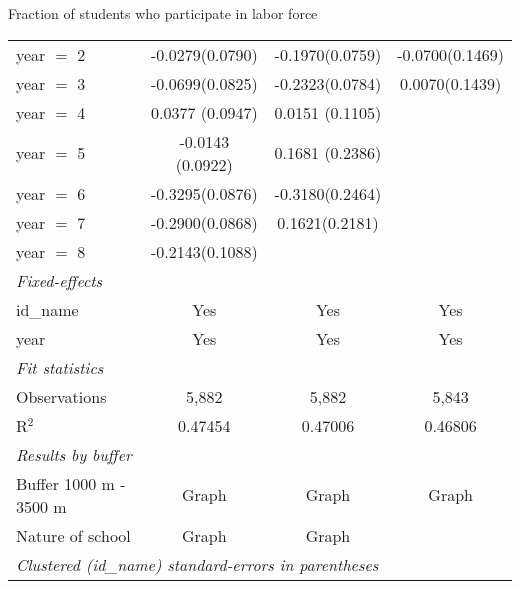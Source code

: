 \documentclass[9pt]{beamer}
\begin{document}
\begin{frame}{Fraction of students who participate in labor force}
\begin{center}
\begin{tabular}{lccc}
   year $=$ 2   & -0.0279(0.0790)           & -0.1970(0.0759) & -0.0700(0.1469)\\   
   year $=$ 3   & -0.0699(0.0825)           & -0.2323(0.0784) & 0.0070(0.1439)\\   
   year $=$ 4   & 0.0377 (0.0947)           & 0.0151 (0.1105)          &   \\   
   year $=$ 5   & -0.0143 (0.0922)        & 0.1681 (0.2386)           &   \\   
   year $=$ 6   & -0.3295(0.0876)   & -0.3180(0.2464)         &   \\   
   year $=$ 7   & -0.2900(0.0868) & 0.1621(0.2181)           &   \\   
   year $=$ 8   & -0.2143(0.1088)   &                 &   \\   
 
   \midrule
   \emph{Fixed-effects}\\
   id\_name     & Yes             & Yes             & Yes\\  
   year         & Yes             & Yes             & Yes\\  
   \midrule
   \emph{Fit statistics}\\
   Observations & 5,882           & 5,882           & 5,843\\  
   R$^2$        & 0.47454         & 0.47006         & 0.46806\\  
   \midrule
   \emph{Results by buffer}\\
   Buffer 1000 m - 3500 m  &  Graph\hyperlink{10p_labor_buf}{\beamerbutton{ !}}            &  Graph\hyperlink{50p_labor_buf}{\beamerbutton{ !}}             &  Graph\hyperlink{100p_labor_buf}{\beamerbutton{ !}}   \\  
    Nature of school &  Graph\hyperlink{10p_labor_nat}{\beamerbutton{ !}}            &  Graph\hyperlink{50p_labor_nat}{\beamerbutton{ !}}             &    \\   
   \midrule  
   \multicolumn{4}{l}{\emph{Clustered (id\_name) standard-errors in parentheses}}\\
   \midrule
\end{tabular}
  \end{center}
\end{frame}
   
\end{document}
